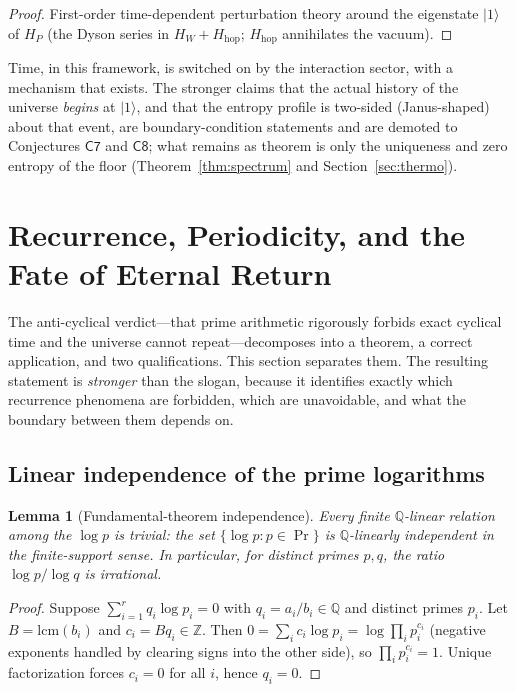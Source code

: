 \documentclass[11pt,a4paper]{article}
\theoremstyle{plain}
\newtheorem{lemma}[theorem]{Lemma}
\theoremstyle{definition}
\theoremstyle{remark}
\newcommand{\ket}[1]{\lvert #1\rangle}
\newcommand{\Zz}{\mathbb{Z}}
\newcommand{\Qq}{\mathbb{Q}}
\begin{document}
\begin{proof}
First-order time-dependent perturbation theory around the eigenstate $\ket{1}$ of $H_{P}$
(the Dyson series in $H_{W}+H_{\mathrm{hop}}$; $H_{\mathrm{hop}}$ annihilates the vacuum).
\end{proof}

Time, in this framework, is switched on by the interaction sector, with a mechanism that
exists. The stronger claims that
the actual history of the universe \emph{begins} at $\ket{1}$, and that the entropy profile is
two-sided (Janus-shaped) about that event, are boundary-condition statements and are demoted
to Conjectures $\mathsf{C7}$ and $\mathsf{C8}$; what remains as theorem is only the
uniqueness and zero entropy of the floor (Theorem~\ref{thm:spectrum} and
Section~\ref{sec:thermo}).

\section{Recurrence, Periodicity, and the Fate of Eternal Return}\label{sec:recurrence}

The anti-cyclical verdict---that prime arithmetic rigorously forbids exact cyclical
time and the universe cannot repeat---decomposes into a theorem, a correct application,
and two qualifications. This section separates them. The
resulting statement is \emph{stronger} than the slogan, because it identifies
exactly which recurrence phenomena are forbidden, which are unavoidable, and what the
boundary between them depends on.

\subsection{Linear independence of the prime logarithms}

\begin{lemma}[Fundamental-theorem independence]\label{lem:independence}
Every \emph{finite} $\Qq$-linear relation among the $\log p$ is trivial: the set
$\{\log p:p\in\Pr\}$ is $\Qq$-linearly independent in the finite-support sense. In
particular, for distinct primes
$p,q$, the ratio $\log p/\log q$ is irrational.
\end{lemma}

\begin{proof}
Suppose $\sum_{i=1}^{r}q_{i}\log p_{i}=0$ with $q_{i}=a_{i}/b_{i}\in\Qq$ and distinct primes
$p_{i}$. Let $B=\mathrm{lcm}(b_{i})$ and $c_{i}=Bq_{i}\in\Zz$. Then
$0=\sum_{i}c_{i}\log p_{i}=\log\prod_{i}p_{i}^{c_{i}}$ (negative exponents handled by clearing
signs into the other side), so $\prod_{i}p_{i}^{c_{i}}=1$. Unique factorization forces
$c_{i}=0$ for all $i$, hence $q_{i}=0$.
\end{proof}
\end{document}
